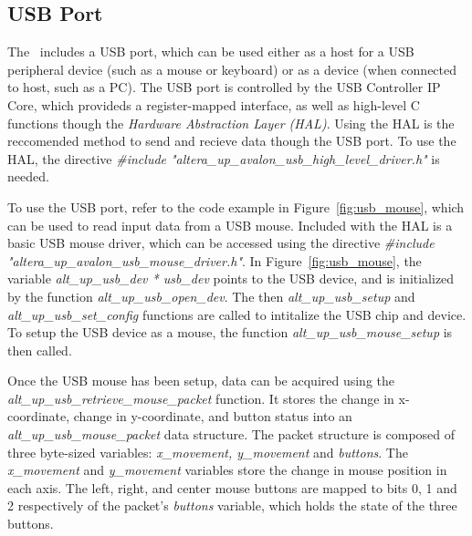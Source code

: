 \subsection{USB Port}
The \systemName~includes a USB port, which can be used either as a host for a USB peripheral
device (such as a mouse or keyboard) or as a device (when connected to host, such as a PC). The USB 
port is controlled by the USB Controller IP Core, which provideds a register-mapped interface, as 
well as high-level C functions though the {\it Hardware Abstraction Layer (HAL)}. Using the HAL is 
the reccomended method to send and recieve data though the USB port. To use the HAL, the directive 
{\it \#include "altera\_up\_avalon\_usb\_high\_level\_driver.h"} is needed.

To use the USB port, refer to the code example in Figure~\ref{fig:usb_mouse}, which can be used to 
read input data from a USB mouse. Included with the HAL is a basic USB mouse driver, which can be 
accessed using the directive {\it \#include "altera\_up\_avalon\_usb\_mouse\_driver.h"}. In 
Figure~\ref{fig:usb_mouse}, the variable {\it alt\_up\_usb\_dev * usb\_dev} points to the USB device,
and is initialized by the function {\it alt\_up\_usb\_open\_dev}. The then {\it alt\_up\_usb\_setup}
and {\it alt\_up\_usb\_set\_config} functions are called to intitalize the USB chip and device. To 
setup the USB device as a mouse, the function  {\it alt\_up\_usb\_mouse\_setup} is then called.

Once the USB mouse has been setup, data can be acquired using the 
{\it alt\_up\_usb\_retrieve\_mouse\_packet} function. It stores the change in x-coordinate, change
in y-coordinate, and button status into an {\it alt\_up\_usb\_mouse\_packet} data structure. The packet 
structure is composed of three byte-sized variables: {\it x\_movement, y\_movement} and {\it buttons}.
The {\it x\_movement} and {\it y\_movement} variables store the change in mouse position in each axis.
The left, right, and center mouse buttons are mapped to bits 0, 1 and 2 respectively of the packet's 
{\it buttons} variable, which holds the state of the three buttons.

